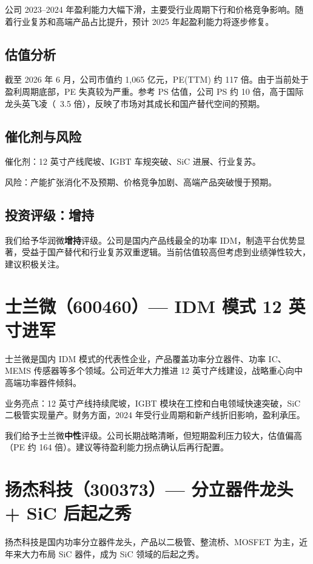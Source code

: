公司 2023–2024 年盈利能力大幅下滑，主要受行业周期下行和价格竞争影响。随着行业复苏和高端产品占比提升，预计 2025 年起盈利能力将逐步修复。

\subsection{估值分析}

截至 2026 年 6 月，公司市值约 1,065 亿元，PE(TTM) 约 117 倍。由于当前处于盈利周期底部，PE 失真较为严重。参考 PS 估值，公司 PS 约 10 倍，高于国际龙头英飞凌（~3.5 倍），反映了市场对其成长和国产替代空间的预期。

\subsection{催化剂与风险}

催化剂：12 英寸产线爬坡、IGBT 车规突破、SiC 进展、行业复苏。

风险：产能扩张消化不及预期、价格竞争加剧、高端产品突破慢于预期。

\subsection{投资评级：增持}

我们给予华润微\textbf{增持}评级。公司是国内产品线最全的功率 IDM，制造平台优势显著，受益于国产替代和行业复苏双重逻辑。当前估值较高但考虑到业绩弹性较大，建议积极关注。

\section{士兰微（600460）— IDM 模式 12 英寸进军}

士兰微是国内 IDM 模式的代表性企业，产品覆盖功率分立器件、功率 IC、MEMS 传感器等多个领域。公司近年大力推进 12 英寸产线建设，战略重心向中高端功率器件倾斜。

业务亮点：12 英寸产线持续爬坡，IGBT 模块在工控和白电领域快速突破，SiC 二极管实现量产。财务方面，2024 年受行业周期和新产线折旧影响，盈利承压。

我们给予士兰微\textbf{中性}评级。公司长期战略清晰，但短期盈利压力较大，估值偏高（PE 约 164 倍）。建议等待盈利能力拐点确认后再行配置。

\section{扬杰科技（300373）— 分立器件龙头 + SiC 后起之秀}

扬杰科技是国内功率分立器件龙头，产品以二极管、整流桥、MOSFET 为主，近年来大力布局 SiC 器件，成为 SiC 领域的后起之秀。

